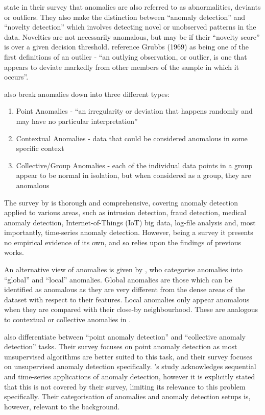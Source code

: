 \documentclass{mproj}
\begin{document}
\cite{deepLearningSurvey} state in their survey that anomalies are also referred to as abnormalities, deviants or outliers. They also make the distinction between ``anomaly detection'' and ``novelty detection'' which involves detecting novel or unobserved patterns in the data. Novelties are not necessarily anomalous, but may be if their ``novelty score'' is over a given decision threshold.
\cite{comparativeUnsupervisedEvaluation} reference Grubbs (1969) as being one of the first definitions of an outlier - ``an outlying observation, or outlier, is one that appears to deviate markedly from other members of the sample in which it occurs''.

\cite{deepLearningSurvey} also break anomalies down into three different types:
\begin{enumerate}
	\item Point Anomalies - ``an irregularity or deviation that happens randomly and may have no particular interpretation''
	\item Contextual Anomalies - data that could be considered anomalous in some specific context
	\item Collective/Group Anomalies - each of the individual data points in a group appear to be normal in isolation, but when considered as a group, they are anomalous
\end{enumerate}

The survey by \cite{deepLearningSurvey} is thorough and comprehensive, covering anomaly detection applied to various areas, such as intrusion detection, fraud detection, medical anomaly detection, Internet-of-Things (IoT) big data, log-file analysis and, most importantly, time-series anomaly detection. However, being a survey it presents no empirical evidence of its own, and so relies upon the findings of previous works.

An alternative view of anomalies is given by \cite{comparativeUnsupervisedEvaluation}, who categorise anomalies into ``global'' and ``local'' anomalies. Global anomalies are those which can be identified as anomalous as they are very different from the dense areas of the dataset with respect to their features.
Local anomalies only appear anomalous when they are compared with their close-by neighbourhood. These are analogous to contextual or collective anomalies in \cite{deepLearningSurvey}.

\cite{comparativeUnsupervisedEvaluation} also differentiate between ``point anomaly detection'' and ``collective anomaly detection'' tasks. Their survey focuses on point anomaly detection as most unsupervised algorithms are better suited to this task, and their survey focuses on unsupervised anomaly detection specifically. \cite{comparativeUnsupervisedEvaluation}'s study acknowledges sequential and time-series applications of
anomaly detection, however it is explicitly stated that this is not covered by their survey, limiting its relevance to this problem specifically. Their categorisation of anomalies and anomaly detection setups is, however, relevant to the background.
\end{document}
